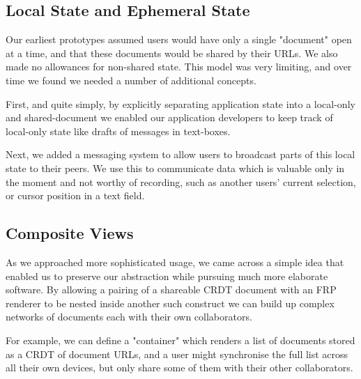 \documentclass[sigplan,10pt]{acmart}
\begin{document}

\subsection{Local State and Ephemeral State}

Our earliest prototypes assumed users would have only a single "document" open at a time, and that these documents would be shared by their URLs. We also made no allowances for non-shared state. This model was very limiting, and over time we found we needed a number of additional concepts.

First, and quite simply, by explicitly separating application state into a local-only and shared-document we enabled our application developers to keep track of local-only state like drafts of messages in text-boxes.

Next, we added a messaging system to allow users to broadcast parts of this local state to their peers. We use this to communicate data which is valuable only in the moment and not worthy of recording, such as another users' current selection, or cursor position in a text field.

\subsection{Composite Views}

As we approached more sophisticated usage, we came across a simple idea that enabled us to preserve our abstraction while pursuing much more elaborate software. By allowing a pairing of a shareable CRDT document with an FRP renderer to be nested inside another such construct we can build up complex networks of documents each with their own collaborators.

For example, we can define a "container" which renders a list of documents stored as a CRDT of document URLs, and a user might synchronise the full list across all their own devices, but only share some of them with their other collaborators.
\end{document}
